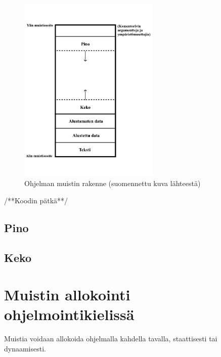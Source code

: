 \begin{figure}[tbh]
{\begin{centering}
\includegraphics[width=0.6\textwidth]{kuvat/muistin_rakenne.pdf}
\par\end{centering}}
\caption{Ohjelman muistin rakenne\cite{mmic2010} (suomennettu kuva lähteestä)}
\end{figure}

/**Koodin pätkä**/

\subsection{Pino}
\subsection{Keko}

\section{Muistin allokointi ohjelmointikielissä}

Muistia voidaan allokoida ohjelmalla kahdella tavalla, staattisesti tai dynaamisesti.